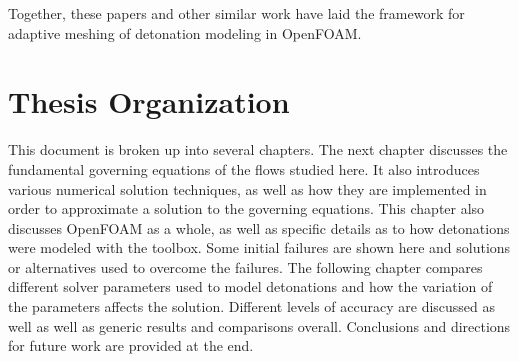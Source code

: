 Together, these papers and other similar work have laid the framework for adaptive meshing of detonation modeling in OpenFOAM. 



\section{Thesis Organization}
This document is broken up into several chapters. The next chapter discusses the fundamental governing equations of the flows studied here. It also introduces various numerical solution techniques, as well as how they are implemented in order to approximate a solution to the governing equations. This chapter also discusses OpenFOAM as a whole, as well as specific details as to how detonations were modeled with the toolbox. Some initial failures are shown here and solutions or alternatives used to overcome the failures. The following chapter compares different solver parameters used to model detonations and how the variation of the parameters affects the solution. Different levels of accuracy are discussed as well as well as generic results and comparisons overall. Conclusions and directions for future work are provided at the end.